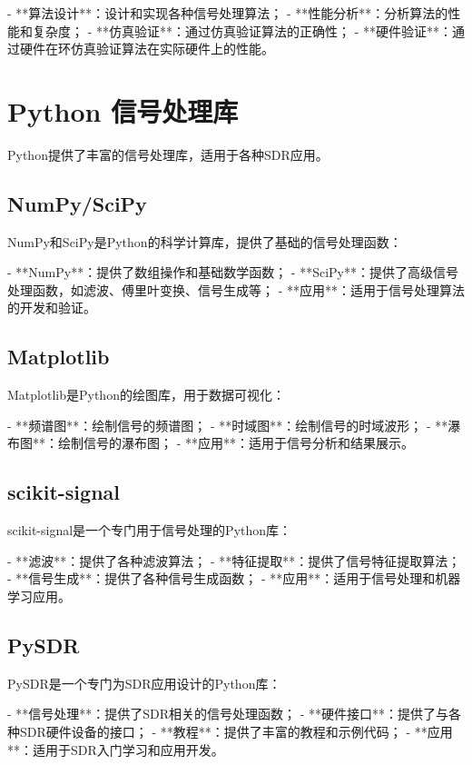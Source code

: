 ﻿\documentclass[UTF8]{ctexbook}
\begin{document}
- **算法设计**：设计和实现各种信号处理算法；
- **性能分析**：分析算法的性能和复杂度；
- **仿真验证**：通过仿真验证算法的正确性；
- **硬件验证**：通过硬件在环仿真验证算法在实际硬件上的性能。

\section{Python 信号处理库}

Python提供了丰富的信号处理库，适用于各种SDR应用。

\subsection{NumPy/SciPy}

NumPy和SciPy是Python的科学计算库，提供了基础的信号处理函数：

- **NumPy**：提供了数组操作和基础数学函数；
- **SciPy**：提供了高级信号处理函数，如滤波、傅里叶变换、信号生成等；
- **应用**：适用于信号处理算法的开发和验证。

\subsection{Matplotlib}

Matplotlib是Python的绘图库，用于数据可视化：

- **频谱图**：绘制信号的频谱图；
- **时域图**：绘制信号的时域波形；
- **瀑布图**：绘制信号的瀑布图；
- **应用**：适用于信号分析和结果展示。

\subsection{scikit-signal}

scikit-signal是一个专门用于信号处理的Python库：

- **滤波**：提供了各种滤波算法；
- **特征提取**：提供了信号特征提取算法；
- **信号生成**：提供了各种信号生成函数；
- **应用**：适用于信号处理和机器学习应用。

\subsection{PySDR}

PySDR是一个专门为SDR应用设计的Python库：

- **信号处理**：提供了SDR相关的信号处理函数；
- **硬件接口**：提供了与各种SDR硬件设备的接口；
- **教程**：提供了丰富的教程和示例代码；
- **应用**：适用于SDR入门学习和应用开发。
\end{document}
